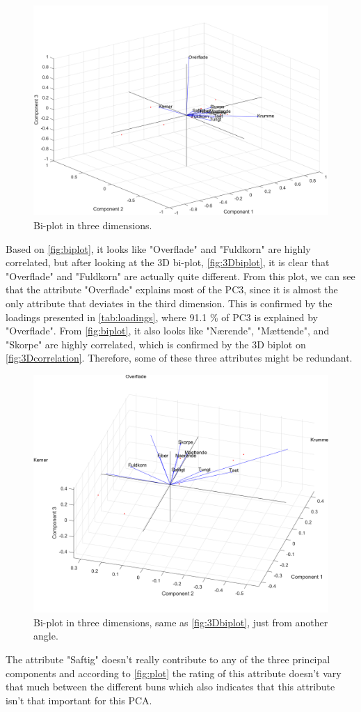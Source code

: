 %
%
\begin{figure}[H]
\centering
\includegraphics[width =\textwidth]{Figure/biplot_3D_std}
\caption{Bi-plot in three dimensions.}
\label{fig:3Dbiplot}
\end{figure}
\noindent
%
Based on \autoref{fig:biplot}, it looks like "Overflade" and "Fuldkorn" are highly correlated, but after looking at the 3D bi-plot, \autoref{fig:3Dbiplot}, it is clear that "Overflade" and "Fuldkorn" are actually quite different. From this plot, we can see that the attribute "Overflade" explains most of the PC3, since it is almost the only attribute that deviates in the third dimension. This is confirmed by the loadings presented in \autoref{tab:loadings}, where 91.1 \% of PC3 is explained by "Overflade".\blankline
%
From \autoref{fig:biplot}, it also looks like "Nærende", "Mættende", and "Skorpe" are highly correlated, which is confirmed by the 3D biplot on \autoref{fig:3Dcorrelation}. Therefore, some of these three attributes might be redundant. 
%
\begin{figure}[H]
\centering
\includegraphics[width =\textwidth]{Figure/biplot_3D_maet}
\caption{Bi-plot in three dimensions, same as \autoref{fig:3Dbiplot}, just from another angle.}
\label{fig:3Dcorrelation}
\end{figure}
\noindent
%
The attribute "Saftig" doesn't really contribute to any of the three principal components and according to \autoref{fig:plot} the rating of this attribute doesn't vary that much between the different buns which also indicates that this attribute isn't that important for this PCA.